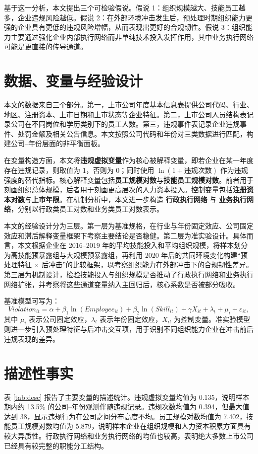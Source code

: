 \documentclass[12pt]{ctexart}
\begin{document}
基于这一分析，本文提出三个可检验假说。假说 1：组织规模越大、技能员工越多，企业违规风险越低。假说 2：在外部环境冲击发生后，预处理时期组织能力更强的企业具有更低的违规风险增幅，从而表现出更好的合规韧性。假说 3：组织能力主要通过强化企业内部执行网络而非单纯技术投入发挥作用，其中业务执行网络可能是更直接的传导通道。

\section{数据、变量与经验设计}
本文的数据来自三个部分。第一，上市公司年度基本信息表提供公司代码、行业、地区、注册资本、上市日期和上市状态等企业特征。第二，上市公司人员结构表记录公司在不同岗位和学历类别下的员工人数。第三，违规事件表记录企业违规事件、处罚金额及相关公告信息。本文按照公司代码和年份对三类数据进行匹配，构建公司--年份层面的非平衡面板。



在变量构造方面，本文将\textbf{违规虚拟变量}作为核心被解释变量，即若企业在某一年度存在违规记录，则取值为 1，否则为 0；同时使用 $\ln(1+\text{违规次数})$ 作为违规强度的替代指标。核心解释变量包括\textbf{员工规模对数}与\textbf{技能员工规模对数}。前者用于刻画组织总体规模，后者用于刻画更高层次的人力资本投入。控制变量包括\textbf{注册资本对数}与\textbf{上市年限}。在机制分析中，本文进一步构造 \textbf{行政执行网络} 与 \textbf{业务执行网络}，分别以行政类员工对数和业务类员工对数表示。

本文的经验设计分为三层。第一层为基准规格，在行业与年份固定效应、公司固定效应和滞后解释变量框架下考察主要结论是否稳健。第二层为准实验设计。具体而言，本文根据企业在 2016--2019 年的平均技能投入和平均组织规模，将样本划分为高技能预暴露组与大规模预暴露组，再利用 2020 年后的共同环境变化构建“预处理特征 $\times$ 后冲击”的比较框架，以考察组织能力在外部冲击下的合规韧性差异。第三层为机制设计，检验技能投入与组织规模是否推动了行政执行网络和业务执行网络扩张，并考察将这些通道变量纳入主回归后，核心系数是否被部分吸收。

基准模型可写为：
\begin{equation}
Violation_{it} = \alpha + \beta_1 \ln(Employee_{it}) + \beta_2 \ln(Skill_{it}) + \gamma X_{it} + \lambda_t + \mu_i + \varepsilon_{it},
\end{equation}
其中 $\mu_i$ 表示公司固定效应，$\lambda_t$ 表示年份固定效应，$X_{it}$ 为控制变量。准实验模型则进一步引入预处理特征与后冲击交互项，用于识别不同组织能力企业在冲击前后违规表现的差异。

\section{描述性事实}
表 \ref{tab:desc} 报告了主要变量的描述统计。违规虚拟变量均值为 0.135，说明样本期内约 13.5\% 的公司--年份观测伴随违规记录。违规次数均值为 0.394，但最大值达到 38，显示违规行为在公司之间分布高度不均。员工规模对数均值为 7.402，技能员工规模对数均值为 5.879，说明样本企业在组织规模和人力资本积累方面具有较大异质性。行政执行网络和业务执行网络的均值也较高，表明绝大多数上市公司已经具有较完整的职能分工结构。
\end{document}
